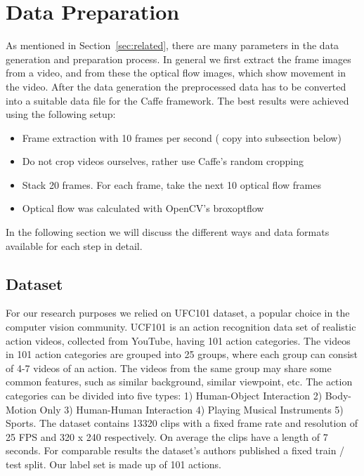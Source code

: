 \section{Data Preparation}
\label{sec:data}

As mentioned in Section~\ref{sec:related}, there are many parameters in the data generation and preparation process.
In general we first extract the frame images from a video, and from these the optical flow images, which show movement in the video.
After the data generation the preprocessed data has to be converted into a suitable data file for the Caffe framework.
The best results were achieved using the following setup:
\begin{itemize}
	\item Frame extraction with 10 frames per second ( copy into subsection below)
	\item Do not crop videos ourselves, rather use Caffe's random cropping
	\item Stack 20 frames. For each frame, take the next 10 optical flow frames
	\item Optical flow was calculated with OpenCV's broxoptflow \cite{brox2004high}
\end{itemize}
In the following section we will discuss the different ways and data formats available for each step in detail.

\subsection{Dataset}
For our research purposes we relied on UFC101\cite{soomro2012ucf101} dataset, a popular choice in the computer vision community. UCF101 is an action recognition data set of realistic action videos, collected from YouTube, having 101 action categories. 
The videos in 101 action categories are grouped into 25 groups, where each group can consist of 4-7 videos of an action. The videos from the same group may share some common features, such as similar background, similar viewpoint, etc. 
The action categories can be divided into five types: 1) Human-Object Interaction 2) Body-Motion Only 3) Human-Human Interaction 4) Playing Musical Instruments 5) Sports. \newline
The dataset contains 13320 clips with a fixed frame rate and resolution of 25 FPS and 320 x 240 respectively. On average the clips have a length of 7 seconds. For comparable results the dataset's authors published a fixed train / test split. Our label set is made up of 101 actions.\newline


